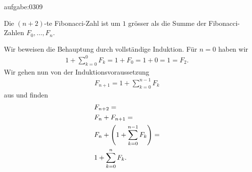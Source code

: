 \begin{antwort}{aufgabe:0309}
\begin{aenum}
    \item Die $(n+2)$-te Fibonacci-Zahl ist um $1$ grösser als die Summe der Fibonacci-Zahlen $F_0,\ldots, F_n$.
    \item Wir beweisen die Behauptung durch vollständige Induktion. Für $n = 0$ haben wir
    \begin{align*}
        1 + \sum_{k=0}^{0} F_k = 1 + F_0 = 1 + 0 = 1 = F_2.
    \end{align*}
    Wir gehen nun von der Induktionsvoraussetzung
    \begin{align*}
        F_{n+1} = 1 + \sum_{k=0}^{n-1} F_k
    \end{align*}
        aus und finden
        \begin{align*}
            &F_{n+2} = \\
            &F_n + F_{n+1} = \\
            &F_n + \left(1 + \sum_{k=0}^{n-1}F_k\right) = \\
            &1 + \sum_{k=0}^{n} F_k.
        \end{align*}
\end{aenum}
\end{antwort}



\clearpage
\shipoutAnswer